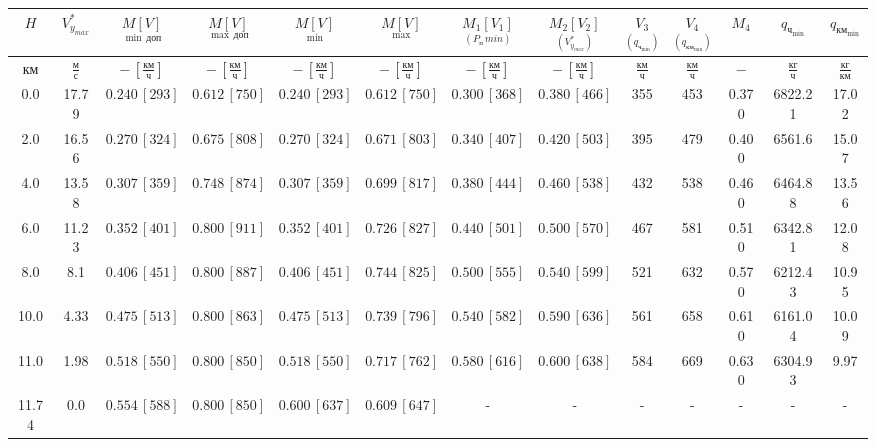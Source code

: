 \begin{tabular}{|c|c|c|c|c|c|c|c|c|c|c|c|c|}
\hline
$H$ & $V_{y_{max}}^*$ & $\underset{\min \, доп}{M [V]}$ & $\underset{\max \, доп}{M [V]}$ & $\underset{\min}{M [V]}$ & $\underset{\max}{M [V]}$ & $\underset{(P_п\, min)}{M_1 [V_1]}$ & $\underset{(V_{y_{max}}^*)}{M_2 [V_2]}$ & $\underset{(q_{ч_{\min}})}{V_3}$ & $\underset{(q_{{км}_{\min}})}{V_4}$ & $M_4$ & $q_{ч_{\min}}$ & $q_{{км}_{\min}}$ \\ 
\hline
$км$ & $\frac{м}{с}$ & $-\,[\frac{км}{ч}]$ & $-\,[\frac{км}{ч}]$ & $-\,[\frac{км}{ч}]$ & $-\,[\frac{км}{ч}]$ & $-\,[\frac{км}{ч}]$ & $-\,[\frac{км}{ч}]$ & $\frac{км}{ч}$ & $\frac{км}{ч}$ & $-$ & $\frac{кг}{ч}$ & $\frac{кг}{км}$ \\ 
\hline
0.0 & 17.79 & $0.240\, [293]$ & $0.612\, [750]$ & $0.240\, [293]$ & $0.612\, [750]$ & $0.300\, [368]$ & $0.380\, [466]$ & 355 & 453 & 0.370 & 6822.21 & 17.02 \\ 
\hline
2.0 & 16.56 & $0.270\, [324]$ & $0.675\, [808]$ & $0.270\, [324]$ & $0.671\, [803]$ & $0.340\, [407]$ & $0.420\, [503]$ & 395 & 479 & 0.400 & 6561.6 & 15.07 \\ 
\hline
4.0 & 13.58 & $0.307\, [359]$ & $0.748\, [874]$ & $0.307\, [359]$ & $0.699\, [817]$ & $0.380\, [444]$ & $0.460\, [538]$ & 432 & 538 & 0.460 & 6464.88 & 13.56 \\ 
\hline
6.0 & 11.23 & $0.352\, [401]$ & $0.800\, [911]$ & $0.352\, [401]$ & $0.726\, [827]$ & $0.440\, [501]$ & $0.500\, [570]$ & 467 & 581 & 0.510 & 6342.81 & 12.08 \\ 
\hline
8.0 & 8.1 & $0.406\, [451]$ & $0.800\, [887]$ & $0.406\, [451]$ & $0.744\, [825]$ & $0.500\, [555]$ & $0.540\, [599]$ & 521 & 632 & 0.570 & 6212.43 & 10.95 \\ 
\hline
10.0 & 4.33 & $0.475\, [513]$ & $0.800\, [863]$ & $0.475\, [513]$ & $0.739\, [796]$ & $0.540\, [582]$ & $0.590\, [636]$ & 561 & 658 & 0.610 & 6161.04 & 10.09 \\ 
\hline
11.0 & 1.98 & $0.518\, [550]$ & $0.800\, [850]$ & $0.518\, [550]$ & $0.717\, [762]$ & $0.580\, [616]$ & $0.600\, [638]$ & 584 & 669 & 0.630 & 6304.93 & 9.97 \\ 
\hline
11.74 & 0.0 & $0.554\, [588]$ & $0.800\, [850]$ & $0.600\, [637]$ & $0.609\, [647]$ & - & - & - & - & - & - & - \\ 
\hline
\end{tabular}